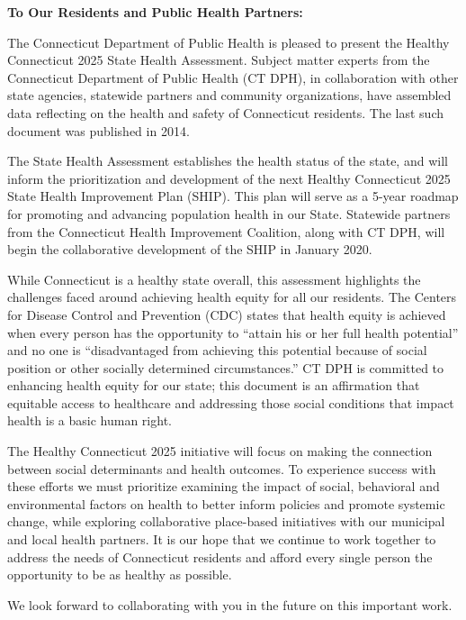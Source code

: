\documentclass[
  letterpaper,
  DIV=11,
  numbers=noendperiod]{scrreprt}
\begin{document}

\textbf{To Our Residents and Public Health Partners:}

The Connecticut Department of Public Health is pleased to present the
Healthy Connecticut 2025 State Health Assessment. Subject matter experts
from the Connecticut Department of Public Health (CT DPH), in
collaboration with other state agencies, statewide partners and
community organizations, have assembled data reflecting on the health
and safety of Connecticut residents. The last such document was
published in 2014.

The State Health Assessment establishes the health status of the state,
and will inform the prioritization and development of the next Healthy
Connecticut 2025 State Health Improvement Plan (SHIP). This plan will
serve as a 5-year roadmap for promoting and advancing population health
in our State. Statewide partners from the Connecticut Health Improvement
Coalition, along with CT DPH, will begin the collaborative development
of the SHIP in January 2020.

While Connecticut is a healthy state overall, this assessment highlights
the challenges faced around achieving health equity for all our
residents. The Centers for Disease Control and Prevention (CDC) states
that health equity is achieved when every person has the opportunity to
``attain his or her full health potential'' and no one is
``disadvantaged from achieving this potential because of social position
or other socially determined circumstances.'' CT DPH is committed to
enhancing health equity for our state; this document is an affirmation
that equitable access to healthcare and addressing those social
conditions that impact health is a basic human right.

The Healthy Connecticut 2025 initiative will focus on making the
connection between social determinants and health outcomes. To
experience success with these efforts we must prioritize examining the
impact of social, behavioral and environmental factors on health to
better inform policies and promote systemic change, while exploring
collaborative place-based initiatives with our municipal and local
health partners. It is our hope that we continue to work together to
address the needs of Connecticut residents and afford every single
person the opportunity to be as healthy as possible.

We look forward to collaborating with you in the future on this
important work.
\end{document}
